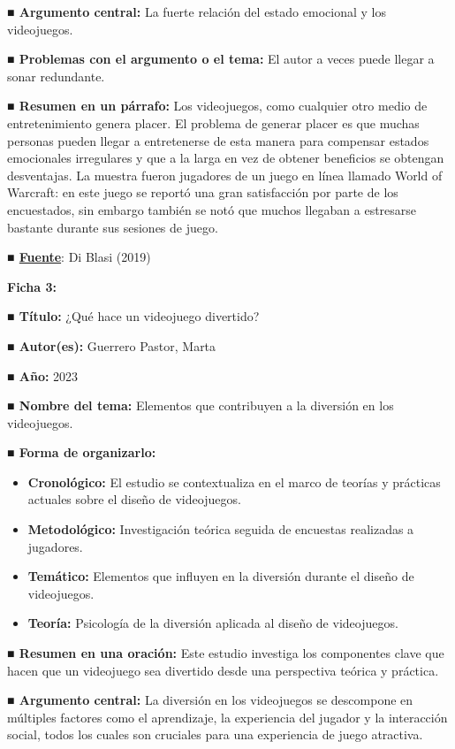 \documentclass[
  letterpaper,
  DIV=11,
  numbers=noendperiod]{scrreprt}
\begin{document}
\textbf{■ Argumento central:} La fuerte relación del estado emocional y
los videojuegos.

\textbf{■ Problemas con el argumento o el tema:} El autor a veces puede
llegar a sonar redundante.

\textbf{■ Resumen en un párrafo:} Los videojuegos, como cualquier otro
medio de entretenimiento genera placer. El problema de generar placer es
que muchas personas pueden llegar a entretenerse de esta manera para
compensar estados emocionales irregulares y que a la larga en vez de
obtener beneficios se obtengan desventajas. La muestra fueron jugadores
de un juego en línea llamado World of Warcraft: en este juego se reportó
una gran satisfacción por parte de los encuestados, sin embargo también
se notó que muchos llegaban a estresarse bastante durante sus sesiones
de juego.

\textbf{■
\href{https://www.ncbi.nlm.nih.gov/pmc/articles/PMC7044601/}{Fuente}}:
Di Blasi (2019)

\textbf{Ficha 3:}

\textbf{■ Título:} ¿Qué hace un videojuego divertido?

\textbf{■ Autor(es):} Guerrero Pastor, Marta

\textbf{■ Año:} 2023

\textbf{■ Nombre del tema:} Elementos que contribuyen a la diversión en
los videojuegos.

\textbf{■ Forma de organizarlo:}

\begin{itemize}
\item
  \textbf{Cronológico:} El estudio se contextualiza en el marco de
  teorías y prácticas actuales sobre el diseño de videojuegos.
\item
  \textbf{Metodológico:} Investigación teórica seguida de encuestas
  realizadas a jugadores.
\item
  \textbf{Temático:} Elementos que influyen en la diversión durante el
  diseño de videojuegos.
\item
  \textbf{Teoría:} Psicología de la diversión aplicada al diseño de
  videojuegos.
\end{itemize}

\textbf{■ Resumen en una oración:} Este estudio investiga los
componentes clave que hacen que un videojuego sea divertido desde una
perspectiva teórica y práctica.

\textbf{■ Argumento central:} La diversión en los videojuegos se
descompone en múltiples factores como el aprendizaje, la experiencia del
jugador y la interacción social, todos los cuales son cruciales para una
experiencia de juego atractiva.
\end{document}
